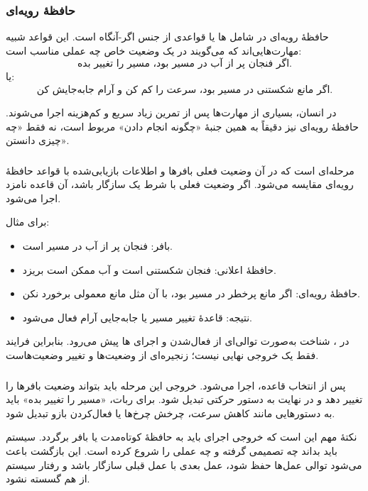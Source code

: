 \subsubsection{حافظهٔ رویه‌ای}
حافظهٔ رویه‌ای در  شامل ها یا قواعدی از جنس اگر-آنگاه است. این قواعد شبیه مهارت‌هایی‌اند که می‌گویند در یک وضعیت خاص چه عملی مناسب است:
\[
\text{اگر فنجان پر از آب در مسیر بود، مسیر را تغییر بده.}
\]
یا:
\[
\text{اگر مانع شکستنی در مسیر بود، سرعت را کم کن و آرام جابه‌جایش کن.}
\]

در انسان، بسیاری از مهارت‌ها پس از تمرین زیاد سریع و کم‌هزینه اجرا می‌شوند. حافظهٔ رویه‌ای نیز دقیقاً به همین جنبهٔ «چگونه انجام دادن» مربوط است، نه فقط «چه چیزی دانستن».

\subsubsection{}
 مرحله‌ای است که در آن وضعیت فعلی بافرها و اطلاعات بازیابی‌شده با قواعد حافظهٔ رویه‌ای مقایسه می‌شود. اگر وضعیت فعلی با شرط یک  سازگار باشد، آن قاعده نامزد اجرا می‌شود.

برای مثال:
\begin{itemize}
  \item بافر: فنجان پر از آب در مسیر است.
  \item حافظهٔ اعلانی: فنجان شکستنی است و آب ممکن است بریزد.
  \item حافظهٔ رویه‌ای: اگر مانع پرخطر در مسیر بود، با آن مثل مانع معمولی برخورد نکن.
  \item نتیجه: قاعدهٔ تغییر مسیر یا جابه‌جایی آرام فعال می‌شود.
\end{itemize}

در ، شناخت به‌صورت توالی‌ای از فعال‌شدن و اجرای ها پیش می‌رود. بنابراین فرایند فقط یک خروجی نهایی نیست؛ زنجیره‌ای از وضعیت‌ها و تغییر وضعیت‌هاست.

\subsubsection{}
پس از انتخاب قاعده،  اجرا می‌شود. خروجی این مرحله باید بتواند وضعیت بافرها را تغییر دهد و در نهایت به دستور حرکتی تبدیل شود. برای ربات، «مسیر را تغییر بده» باید به دستورهایی مانند کاهش سرعت، چرخش چرخ‌ها یا فعال‌کردن بازو تبدیل شود.

نکتهٔ مهم این است که خروجی اجرای  باید به حافظهٔ کوتاه‌مدت یا بافر برگردد. سیستم باید بداند چه تصمیمی گرفته و چه عملی را شروع کرده است. این بازگشت باعث می‌شود توالی عمل‌ها حفظ شود، عمل بعدی با عمل قبلی سازگار باشد و رفتار سیستم از هم گسسته نشود.

